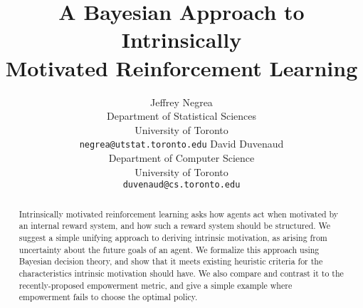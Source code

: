 \documentclass{article}
\title{A Bayesian Approach to Intrinsically\\Motivated Reinforcement Learning}
\author{
 Jeffrey Negrea\\
 Department of Statistical Sciences\\
 University of Toronto\\
 \texttt{negrea@utstat.toronto.edu}
 \And
 David Duvenaud\\
 Department of Computer Science\\
 University of Toronto\\
 \texttt{duvenaud@cs.toronto.edu}
}
\begin{document}
\maketitle

\begin{abstract}
Intrinsically motivated reinforcement learning asks how agents act when motivated by an internal reward system, and how such a reward system should be structured. 
We suggest a simple unifying approach to deriving intrinsic motivation, as arising from uncertainty about the future goals of an agent.
We formalize this approach using Bayesian decision theory, and show that it meets existing heuristic criteria for the characteristics intrinsic motivation should have. 
We also compare and contrast it to the recently-proposed empowerment metric, and give a simple example where empowerment fails to choose the optimal policy.
\end{abstract}
\end{document}
